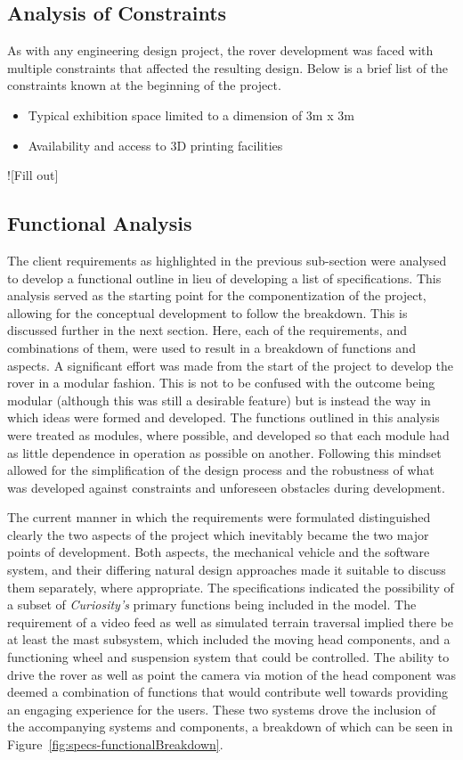   \subsection{Analysis of Constraints}
    As with any engineering design project, the rover development was faced with multiple constraints that affected the resulting design. Below is a brief list of the constraints known at the beginning of the project.
    
    \begin{itemize}
      \item Typical exhibition space limited to a dimension of 3m x 3m
      \item Availability and access to 3D printing facilities
    \end{itemize}
    
    ![Fill out]
    
  \subsection{Functional Analysis}
    The client requirements as highlighted in the previous sub-section were analysed to develop a functional outline in lieu of developing a list of specifications. This analysis served as the starting point for the componentization of the project, allowing for the conceptual development to follow the breakdown. This is discussed further in the next section. Here, each of the requirements, and combinations of them, were used to result in a breakdown of functions and aspects. A significant effort was made from the start of the project to develop the rover in a modular fashion. This is not to be confused with the outcome being modular (although this was still a desirable feature) but is instead the way in which ideas were formed and developed. The functions outlined in this analysis were treated as modules, where possible, and developed so that each module had as little dependence in operation as possible on another. Following this mindset allowed for the simplification of the design process and the robustness of what was developed against constraints and unforeseen obstacles during development.
    
    The current manner in which the requirements were formulated distinguished clearly the two aspects of the project which inevitably became the two major points of development. Both aspects, the mechanical vehicle and the software system, and their differing natural design approaches made it suitable to discuss them separately, where appropriate. The specifications indicated the possibility of a subset of \textit{Curiosity's} primary functions being included in the model. The requirement of a video feed as well as simulated terrain traversal implied there be at least the mast subsystem, which included the moving head components, and a functioning wheel and suspension system that could be controlled. The ability to drive the rover as well as point the camera via motion of the head component was deemed a combination of functions that would contribute well towards providing an engaging experience for the users. These two systems drove the inclusion of the accompanying systems and components, a breakdown of which can be seen in Figure~\ref{fig:specs-functionalBreakdown}.
    

